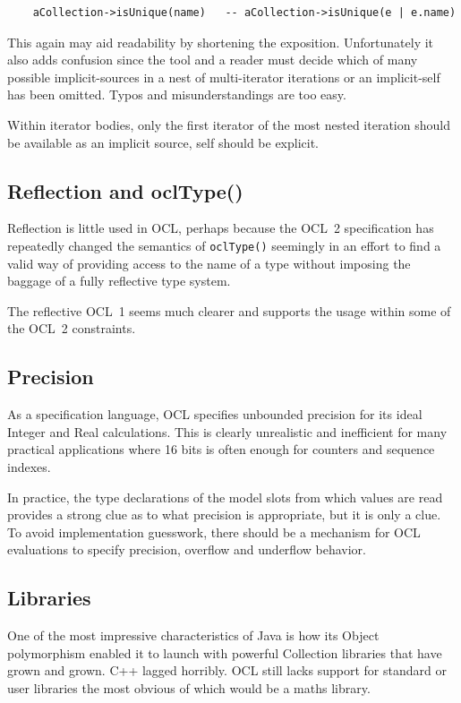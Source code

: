 \documentclass{jot}
\begin{document}
\begin{verbatim}
    aCollection->isUnique(name)   -- aCollection->isUnique(e | e.name)
\end{verbatim}

This again may aid readability by shortening the exposition. Unfortunately it also adds confusion since the tool and a reader must decide which of many possible implicit-sources in a nest of multi-iterator iterations or an implicit-self has been omitted. Typos and misunderstandings are too easy.

Within iterator bodies, only the first iterator of the most nested iteration should be available as an implicit source, self should be explicit.

\subsection{Reflection and oclType()}

Reflection is little used in OCL, perhaps because the OCL~2 specification has repeatedly changed the semantics of \verb$oclType()$ seemingly in an effort to find a valid way of providing access to the name of a type without imposing the baggage of a fully reflective type system.

The reflective OCL~1 seems much clearer and supports the usage within some of the OCL~2 constraints.

\subsection{Precision}

As a specification language, OCL specifies unbounded precision for its ideal Integer and Real calculations. This is clearly unrealistic and inefficient for many practical applications where 16 bits is often enough for counters and sequence indexes.

In practice, the type declarations of the model slots from which values are read provides a strong clue as to what precision is appropriate, but it is only a clue. To avoid implementation guesswork, there should be a mechanism for OCL evaluations to specify precision, overflow and underflow behavior.

\subsection{Libraries}

One of the most impressive characteristics of Java is how its Object polymorphism enabled it to launch with powerful Collection libraries that have grown and grown. C++ lagged horribly. OCL still lacks support for standard or user libraries the most obvious of which would be a maths library.
\end{document}
